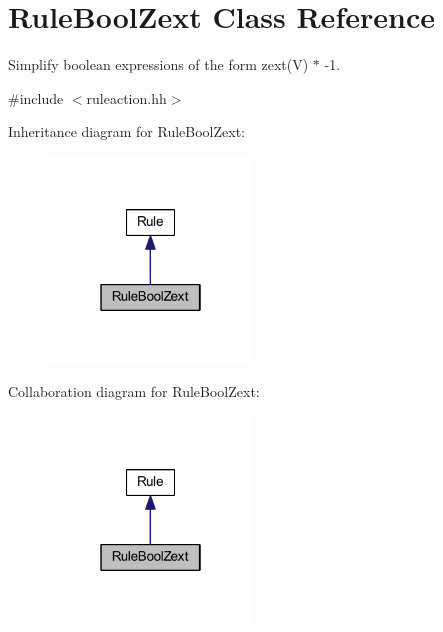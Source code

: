 \hypertarget{class_rule_bool_zext}{}\section{Rule\+Bool\+Zext Class Reference}
\label{class_rule_bool_zext}


Simplify boolean expressions of the form zext(\+V) $\ast$ -\/1.  




{\ttfamily \#include $<$ruleaction.\+hh$>$}



Inheritance diagram for Rule\+Bool\+Zext\+:
\nopagebreak
\begin{figure}[H]
\begin{center}
\leavevmode
\includegraphics[width=154pt]{class_rule_bool_zext__inherit__graph}
\end{center}
\end{figure}


Collaboration diagram for Rule\+Bool\+Zext\+:
\nopagebreak
\begin{figure}[H]
\begin{center}
\leavevmode
\includegraphics[width=154pt]{class_rule_bool_zext__coll__graph}
\end{center}
\end{figure}
